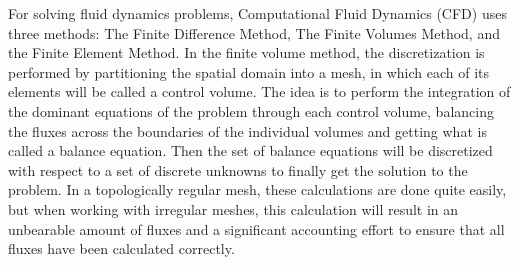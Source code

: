 \documentclass[12pt,letterpaper]{article}
\begin{document}

For solving fluid dynamics problems, Computational Fluid Dynamics (CFD) uses three methods: The Finite Difference Method, The Finite Volumes Method, and the Finite Element Method.  In the finite volume method, the discretization is performed by partitioning the spatial domain into a mesh, in which each of its elements will be called a control volume. The idea is to perform the integration of the dominant equations of the problem through each control volume, balancing the fluxes across the boundaries of the individual volumes and getting what is called a balance equation. Then the set of balance equations will be discretized with respect to a set of discrete unknowns to finally get the solution to the problem\cite{volumes}. In a topologically regular mesh, these calculations are done quite easily, but when working with irregular meshes, this calculation will result in an unbearable amount of fluxes and a significant accounting effort to ensure that all fluxes have been calculated correctly\cite{AutoDesk}.\\
\end{document}
